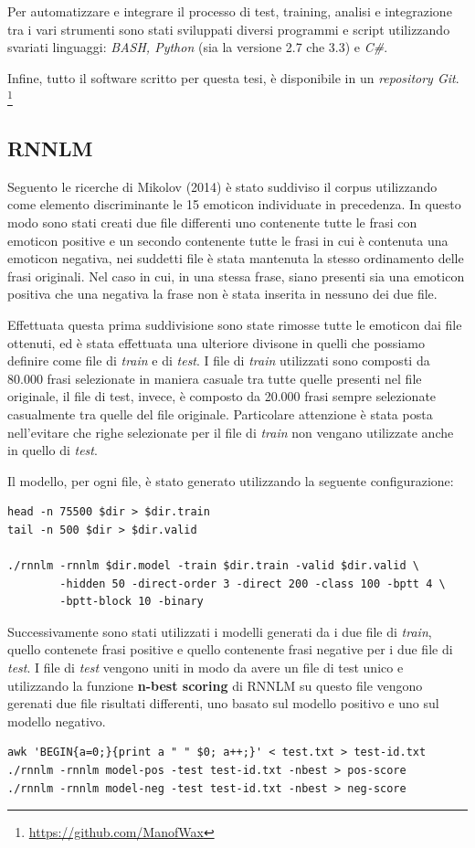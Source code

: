 \documentclass[a4paper,12pt,openright,twoside]{report}
\theoremstyle{definition}
\begin{document}
Per automatizzare e integrare il processo di test, training, analisi e integrazione tra i vari strumenti
sono stati sviluppati diversi programmi e script utilizzando svariati linguaggi: \emph{BASH, Python} (sia 
la versione 2.7 che 3.3) e \emph{C\#}.

Infine, tutto il software scritto per questa tesi, è disponibile in un \emph{repository Git}.
\footnote{\url{https://github.com/ManofWax}}

\subsection{RNNLM}
\label{sss:rnnlm}
Seguento le ricerche di Mikolov (2014) %
è stato suddiviso il corpus utilizzando come elemento discriminante le 15 emoticon individuate in precedenza.
In questo modo
sono stati creati due file differenti uno contenente tutte le frasi con emoticon positive e un secondo contenente
tutte le frasi in cui è contenuta una emoticon negativa, nei suddetti file è stata mantenuta la stesso ordinamento delle frasi originali.
Nel caso in cui, in una stessa frase, siano presenti sia una emoticon positiva che una negativa la frase non è stata
inserita in nessuno dei due file.

Effettuata questa prima suddivisione sono state rimosse tutte le emoticon dai file ottenuti, ed è stata effettuata 
una ulteriore divisone in quelli che possiamo definire come file di \emph{train} e di \emph{test}.
I file di \emph{train} utilizzati sono composti da 80.000 frasi selezionate in maniera casuale tra tutte quelle presenti nel file originale,
il file di test, invece, è composto da 20.000 frasi sempre selezionate casualmente tra quelle del file originale.
Particolare attenzione è stata posta nell'evitare che righe selezionate per il file di \emph{train}
non vengano utilizzate anche in quello di \emph{test}.

Il modello, per ogni file, è stato generato utilizzando la seguente configurazione:

\begin{verbatim}
head -n 75500 $dir > $dir.train
tail -n 500 $dir > $dir.valid

./rnnlm -rnnlm $dir.model -train $dir.train -valid $dir.valid \
        -hidden 50 -direct-order 3 -direct 200 -class 100 -bptt 4 \
        -bptt-block 10 -binary
\end{verbatim}

Successivamente sono stati utilizzati i modelli generati da i due file di \emph{train}, quello contenete
frasi positive e quello contenente frasi negative per i due file di \emph{test}. I file di \emph{test}
vengono uniti in modo da avere un file di test unico e utilizzando la funzione \textbf{n-best scoring} di RNNLM
su questo file vengono gerenati due file risultati differenti, uno basato sul
modello positivo e uno sul modello negativo.
\begin{verbatim}
awk 'BEGIN{a=0;}{print a " " $0; a++;}' < test.txt > test-id.txt
./rnnlm -rnnlm model-pos -test test-id.txt -nbest > pos-score
./rnnlm -rnnlm model-neg -test test-id.txt -nbest > neg-score
\end{verbatim}
\end{document}
